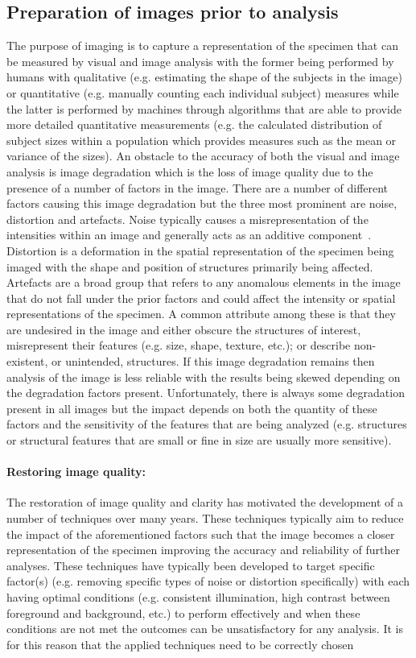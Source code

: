 \subsection{Preparation of images prior to analysis}\label{sec:intro_noise}
The purpose of imaging is to capture a representation of the specimen that can be measured by visual and image analysis with the former being performed by humans with qualitative (e.g. estimating the shape of the subjects in the image) or quantitative (e.g. manually counting each individual subject) measures while the latter is performed by machines through algorithms that are able to provide more detailed quantitative measurements (e.g. the calculated distribution of subject sizes within a population which provides measures such as the mean or variance of the sizes). An obstacle to the accuracy of both the visual and image analysis is image degradation which is the loss of image quality due to the presence of a number of factors in the image. There are a number of different factors causing this image degradation but the three most prominent are noise, distortion and artefacts. Noise typically causes a misrepresentation of the intensities within an image and generally acts as an additive component~\cite{digitize_noise_chapt}. Distortion is a deformation in the spatial representation of the specimen being imaged with the shape and position of structures primarily being affected. Artefacts are a broad group that refers to any anomalous elements in the image that do not fall under the prior factors and could affect the intensity or spatial representations of the specimen. A common attribute among these is that they are undesired in the image and either obscure the structures of interest, misrepresent their features (e.g. size, shape, texture, etc.); or describe non-existent, or unintended, structures. If this image degradation remains then analysis of the image is less reliable with the results being skewed depending on the degradation factors present. Unfortunately, there is always some degradation present in all images but the impact depends on both the quantity of these factors and the sensitivity of the features that are being analyzed (e.g. structures or structural features that are small or fine in size are usually more sensitive).\paragraph{Restoring image quality:} The restoration of image quality and clarity has motivated the development of a number of techniques over many years. These techniques typically aim to reduce the impact of the aforementioned factors such that the image becomes a closer representation of the specimen improving the accuracy and reliability of further analyses. These techniques have typically been developed to target specific factor(s) (e.g. removing specific types of noise or distortion specifically) with each having optimal conditions (e.g. consistent illumination, high contrast between foreground and background, etc.) to perform effectively and when these conditions are not met the outcomes can be unsatisfactory for any analysis. It is for this reason that the applied techniques need to be correctly chosen 